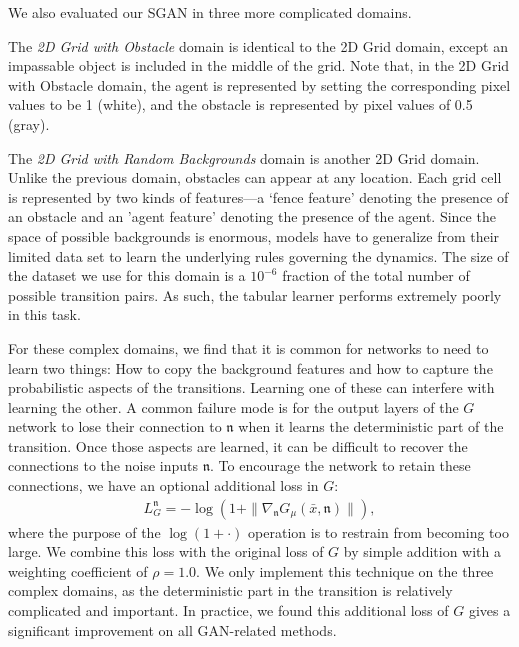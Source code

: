 \documentclass[letterpaper]{article} %
\begin{document}
We also evaluated our SGAN in three more complicated domains.

The \emph{2D Grid with Obstacle} domain is identical to the 2D Grid domain, except an impassable object is included in the middle of the grid. Note that, in the 2D Grid with Obstacle domain, the agent is represented by setting the corresponding pixel values to be 1 (white), and the obstacle is represented by pixel values of 0.5 (gray).

The \emph{2D Grid with Random Backgrounds} domain is another 2D Grid domain. Unlike the previous domain, obstacles can appear at any location. Each grid cell is represented by two kinds of features---a `fence feature' denoting the presence of an obstacle and an 'agent feature' denoting the presence of the agent.
Since the space of possible backgrounds is enormous, models have to generalize from their limited data set to learn the underlying rules governing the dynamics. The size of the dataset we use for this domain is a $10^{-6}$ fraction of the total number of possible transition pairs. As such, the tabular learner performs extremely poorly in this task.

For these complex domains, we find that it is common for networks to need to learn two things: How to copy the background features and how to capture the probabilistic aspects of the transitions. Learning one of these can interfere with learning the other. A common failure mode is for the output layers of the $G$ network to lose their connection to $\mathfrak{n}$ when it learns the deterministic part of the transition. Once those aspects are learned, it can be difficult to recover the connections to the noise inputs $\mathfrak{n}$.
To encourage the network to retain these connections, we have an optional additional loss in $G$:
\begin{eqnarray}\label{loss-g-n}
    L_G^{\mathfrak{n}}=-\log(1+\|\nabla_{\mathfrak{n}}G_{\mu}(\bar{x},\mathfrak{n})\|),
\end{eqnarray}
where the purpose of the $\log(1+\cdot)$ operation is to restrain from becoming too large. We combine this loss with the original loss of $G$ by simple addition with a weighting coefficient of $\rho=1.0$. We only implement this technique on the three complex domains, as the deterministic part in the transition is relatively complicated and important. In practice, we found this additional loss of $G$ gives a significant improvement on all GAN-related methods.
\end{document}
